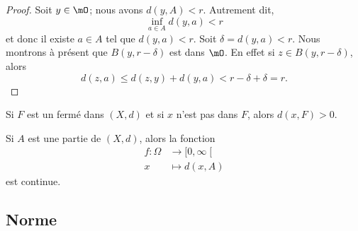 \begin{proof}
   Soit \( y\in \mO\); nous avons \( d(y,A)<r\). Autrement dit,
   \begin{equation}
       \inf_{a\in A}d(y,a)<r
   \end{equation}
   et donc il existe \( a\in A\) tel que \( d(y,a)<r\). Soit \( \delta=d(y,a)<r\). Nous montrons à présent que \( B(y,r-\delta)\) est dans \( \mO\). En effet si \( z\in B(y,r-\delta)\), alors
   \begin{equation}
       d(z,a)\leq d(z,y)+d(y,a)<r-\delta+\delta=r.
   \end{equation}
\end{proof}

\begin{lemma}        \label{LEMooEQIZooLpsbOe}
    Si \( F\) est un fermé dans \( (X,d)\) et si \( x\) n'est pas dans \( F\), alors \( d(x,F)>0\).
\end{lemma}

\begin{lemma}        \label{LEMooCFGTooIfdcfk}
    Si \( A\) est une partie de \( (X,d)\), alors la fonction
    \begin{equation}
        \begin{aligned}
            f\colon \Omega&\to \mathopen[ 0 , \infty \mathclose[ \\
            x&\mapsto d(x,A) 
        \end{aligned}
    \end{equation}
    est continue.
\end{lemma}

\subsection{Norme}

